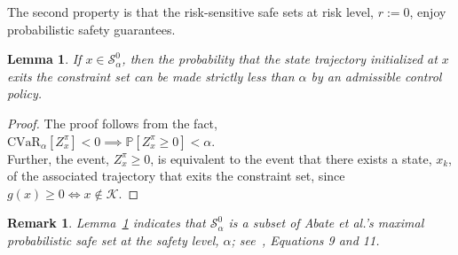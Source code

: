 \documentclass[letterpaper, 10 pt, conference]{ieeeconf}  %
\newtheorem{lemma}{Lemma}
\newtheorem{remark}{Remark}
\begin{document}
The second property is that the risk-sensitive safe sets at risk level, $r := 0$, enjoy probabilistic safety guarantees.
\begin{lemma}\label{mylemma1}
If $x \in \mathcal{S}_\alpha^0$, then the probability that the state trajectory initialized at $x$ exits the constraint set can be made strictly
less than $\alpha$ by an admissible control policy.
\end{lemma}
\begin{proof}
The proof follows from the fact,\footnotemark \\
$\text{CVaR}_\alpha[Z_x^\pi] < 0 \implies \mathbb{P}[Z_x^\pi\geq 0] < \alpha$. \\
Further, the event, $Z_x^\pi\geq 0$, is equivalent to the event that there exists a state, $x_k$, of the associated trajectory 
that exits the constraint set, since $g(x) \geq 0 \iff x \notin \mathcal{K}$.\footnotemark
{}
\end{proof}
\begin{remark}{}
Lemma~\ref{mylemma1} indicates that $\mathcal{S}_\alpha^0$ is a subset of Abate et al.'s \textit{maximal probabilistic safe set} at the safety level, $\alpha$;
see~\cite{abate2008probabilistic}, Equations 9 and 11.
\end{remark}
\end{document}
